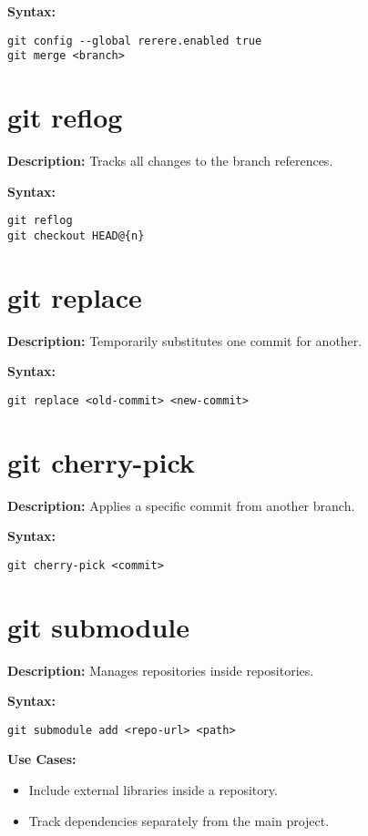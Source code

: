 \documentclass{article}
\begin{document}
\textbf{Syntax:}
\begin{lstlisting}
git config --global rerere.enabled true
git merge <branch>
\end{lstlisting}

\section{git reflog}
\textbf{Description:} Tracks all changes to the branch references.

\textbf{Syntax:}
\begin{lstlisting}
git reflog
git checkout HEAD@{n}
\end{lstlisting}

\section{git replace}
\textbf{Description:} Temporarily substitutes one commit for another.

\textbf{Syntax:}
\begin{lstlisting}
git replace <old-commit> <new-commit>
\end{lstlisting}

\section{git cherry-pick}
\textbf{Description:} Applies a specific commit from another branch.

\textbf{Syntax:}
\begin{lstlisting}
git cherry-pick <commit>
\end{lstlisting}

\section{git submodule}
\textbf{Description:} Manages repositories inside repositories.

\textbf{Syntax:}
\begin{lstlisting}
git submodule add <repo-url> <path>
\end{lstlisting}

\textbf{Use Cases:}
\begin{itemize}
    \item Include external libraries inside a repository.
    \item Track dependencies separately from the main project.
\end{itemize}
\end{document}
